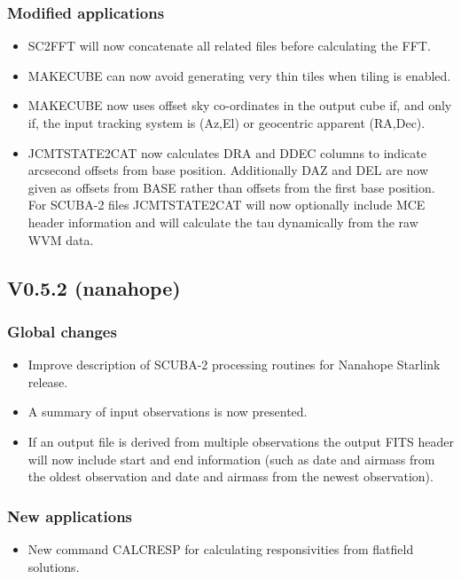 \documentclass[twoside,11pt]{article}
\renewcommand{\_}{\texttt{\symbol{95}}}
\begin{document}
\subsubsection*{Modified applications}
\begin{itemize}
\item SC2FFT will now concatenate all related files before calculating the FFT.
\item MAKECUBE can now avoid generating very thin tiles when tiling is enabled.
\item MAKECUBE now uses offset sky co-ordinates in the output cube if,
  and only if, the input tracking system is (Az,El) or geocentric
  apparent (RA,Dec).
\item JCMTSTATE2CAT now calculates DRA and DDEC columns to indicate
  arcsecond offsets from base position. Additionally DAZ and DEL are
  now given as offsets from BASE rather than offsets from the first
  base position. For SCUBA-2 files JCMTSTATE2CAT will now optionally include
  MCE header information and will calculate the tau dynamically from the
  raw WVM data.
\end{itemize}

\subsection{V0.5.2 (nanahope)}

\subsubsection*{Global changes}
\begin{itemize}
\item Improve description of SCUBA-2 processing routines for Nanahope
  Starlink release.
\item A summary of input observations is now presented.
\item If an output file is derived from multiple observations the
  output FITS header will now include start and end information (such
  as date and airmass from the oldest observation and date and airmass
  from the newest observation).

\end{itemize}

\subsubsection*{New applications}
\begin{itemize}
  \item New command CALCRESP for calculating responsivities from
    flatfield solutions.
\end{itemize}
\end{document}
